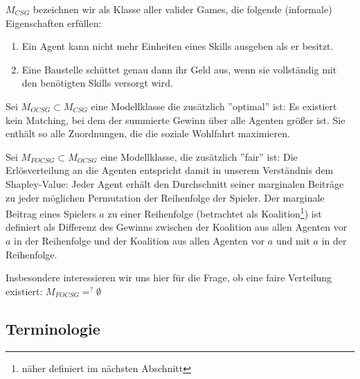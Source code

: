 $M_{CSG}$ bezeichnen wir als Klasse aller valider Games, die folgende (informale) Eigenschaften erfüllen:
\begin{enumerate}
  \item Ein Agent kann nicht mehr Einheiten eines Skills ausgeben als er besitzt.
  \item Eine Baustelle schüttet genau dann ihr Geld aus, wenn sie vollständig mit den benötigten Skills versorgt wird.
\end{enumerate}

%
%
Sei $M_{OCSG} \subset M_{CSG}$ eine Modellklasse die zusätzlich ''optimal'' ist:
Es existiert kein Matching, bei dem der summierte Gewinn über alle Agenten größer ist. Sie enthält so alle Zuordnungen, die die soziale Wohlfahrt maximieren.

Sei $M_{FOCSG}\subset M_{OCSG}$ eine Modellklasse, die zusätzlich ''fair'' ist: Die Erlösverteilung an die Agenten entspricht damit in unserem Verständnis dem Shapley-Value: Jeder Agent erhält den Durchschnitt seiner marginalen Beiträge zu jeder möglichen Permutation der Reihenfolge der Spieler. Der marginale Beitrag eines Spielers $a$ zu einer Reihenfolge (betrachtet als Koalition\footnote{näher definiert im nächsten Abschnitt}) ist definiert als Differenz des Gewinns zwischen der Koalition aus allen Agenten vor $a$ in der Reihenfolge und der Koalition aus allen Agenten vor $a$ und mit $a$ in der Reihenfolge.

Insbesondere interessieren wir uns hier für die Frage, ob eine faire Verteilung existiert: $M_{FOCSG} =^? \emptyset$

\subsection{Terminologie}
\label{sigmod}

